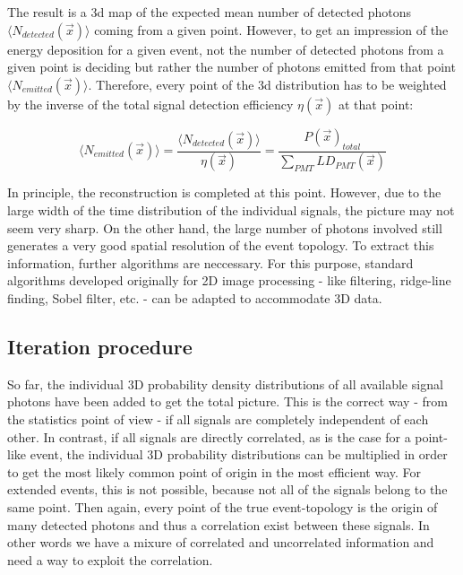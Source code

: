 %  
%  
  The result is a 3d map of the expected mean number of detected photons $\langle N_{detected}(\vec{x}) \rangle$ coming from a given point. However, to get an impression of the energy
  deposition for a given event, not the number of detected photons from a given point is deciding but rather the number of photons emitted from that point $\langle N_{emitted}(\vec{x}) \rangle$.
  Therefore, every point of the 3d distribution has to be weighted by the inverse of the total signal detection efficiency $\eta(\vec{x})$ at that point:
  
  \begin{equation}
     \langle N_{emitted}(\vec{x}) \rangle = \frac{\langle N_{detected}(\vec{x}) \rangle}{\eta(\vec{x})} = \frac{P(\vec{x})_{total}}{\sum_{PMT} LD_{PMT}(\vec{x})}
  \end{equation}
  
  
  In principle, the reconstruction is completed at this point. However, due to the large width of the time distribution of the individual signals, the picture may not seem very
  sharp. On the other hand, the large number of photons involved still generates a very good spatial resolution of the event topology.
  To extract this information, further algorithms are neccessary. For this purpose, standard algorithms developed originally for 2D image processing - like filtering, ridge-line finding,
  Sobel filter, etc. - can be adapted to accommodate 3D data.
  
  \subsection*{Iteration procedure}
  
  
  So far, the individual 3D probability density distributions of all available signal photons have been added to get the total picture. 
  This is the correct way - from the statistics point of view - if all signals are completely independent of each other. In contrast, if
  all signals are directly correlated, as is the case for a point-like event, the individual 3D probability distributions can be multiplied
  in order to get the most likely common point of origin in the most efficient way. For extended events, this is not possible, because 
  not all of the signals belong to the same point. Then again, every point of the true event-topology is the origin of many detected photons
  and thus a correlation exist between these signals. In other words we have a mixure of correlated and uncorrelated information and need a 
  way to exploit the correlation.
  

